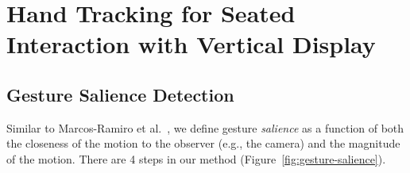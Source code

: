 \section{Hand Tracking for Seated Interaction with Vertical Display}
\subsection{Gesture Salience Detection}
Similar to Marcos-Ramiro et al.~\cite{marcos2013}, we define gesture
\textit{salience} as a function of both the closeness of the motion to the
observer (e.g., the camera) and the magnitude of the motion.
There are 4 steps in our method (Figure~\ref{fig:gesture-salience}).

\begin{figure}[tb]
\centering
\hspace{-0.6em}%
\end{figure}
